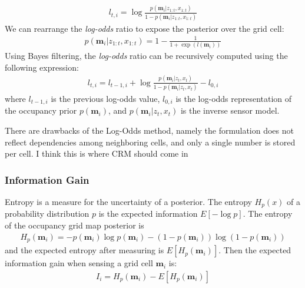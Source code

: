 \documentclass[letterpaper, 10 pt, conference]{ieeeconf}  %
\newcommand{\todo}[1]{{\color{red} #1 }} %
\begin{document}
\begin{align}
    l_{t,i} = \log\frac{p(\textbf{m}_i | z_{1:t},x_{1:t})}{1-p(\textbf{m}_i | z_{1:t},x_{1:t})}
    \label{log_odd}
\end{align}
We can rearrange the \emph{log-odds} ratio to expose the posterior over the grid cell:
\begin{align}
    p(\textbf{m}_i | z_{1:t},x_{1:t}) = 1-\frac{1}{1+\exp(l(\textbf{m}_i))}
\end{align}
Using Bayes filtering, the \emph{log-odds} ratio can be recursively computed using the following expression: 
\begin{align}
    l_{t,i} = l_{t-1,i} + \log\frac{p(\textbf{m}_i | z_{t},x_{t})}{1-p(\textbf{m}_i | z_{t},x_{t})} - l_{0,i}
\end{align}
\noindent where $l_{t-1,i}$ is the previous log-odds value, $l_{0,i}$ is the log-odds representation of the occupancy prior $p(\textbf{m}_i)$, and $p(\textbf{m}_i | z_{t},x_{t})$ is the inverse sensor model.

There are drawbacks of the Log-Odds method, namely the formulation does not reflect dependencies among neighboring cells, and only a single number is stored per cell. \todo{I think this is where CRM should come in}

\subsubsection{Information Gain}
Entropy is a measure for the uncertainty of a posterior. The entropy $H_p(x)$ of a probability distribution $p$ is the expected information $E[-\log p]$. The entropy of the occupancy grid map posterior is
\begin{align}
    H_p(\textbf{m}_i) = -p(\textbf{m}_i) \log p(\textbf{m}_i) - (1-p(\textbf{m}_i)) \log(1-p(\textbf{m}_i))
\end{align}
\noindent and the expected entropy after measuring is $E[H_{p}(\textbf{m}_i)]$. Then the expected information gain when sensing a grid cell $\textbf{m}_i$ is: 
\begin{align}
    I_i = H_p(\textbf{m}_i) - E[H_{p}(\textbf{m}_i)]
\end{align}
\end{document}
